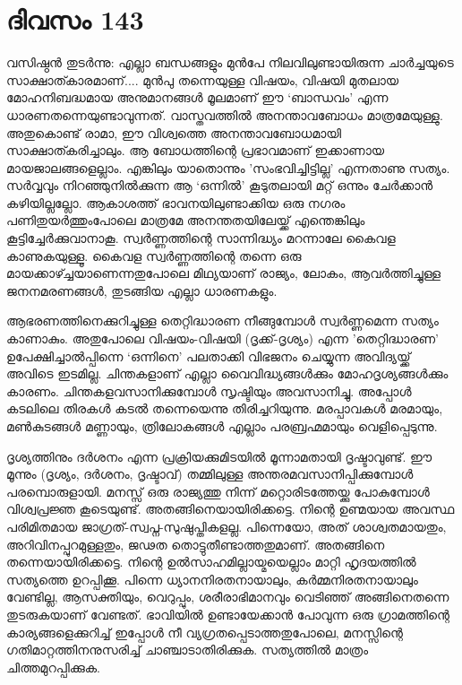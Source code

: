 \newpage
\section{ദിവസം 143}


വസിഷ്ഠൻ തുടർന്നു: എല്ലാ ബന്ധങ്ങളും മുൻപേ നിലവിലുണ്ടായിരുന്ന ചാര്‍ച്ചയുടെ  സാക്ഷാത്കാരമാണ്‌....   മുന്‍പു തന്നെയുള്ള  വിഷയം, വിഷയി മുതലായ  മോഹനിബദ്ധമായ അനുമാനങ്ങൾ മൂലമാണ്‌ ഈ ‘ബാന്ധവം’ എന്ന ധാരണതന്നെയുണ്ടാവുന്നത്. വാസ്തവത്തിൽ അനന്താവബോധം മാത്രമേയുള്ളു. അതുകൊണ്ട് രാമാ, ഈ വിശ്വത്തെ അനന്താവബോധമായി സാക്ഷാത്കരിച്ചാലും. ആ ബോധത്തിന്റെ പ്രഭാവമാണ്‌ ഇക്കാണായ മായജാലങ്ങളെല്ലാം. എങ്കിലും യാതൊന്നും 'സംഭവിച്ചിട്ടില്ല' എന്നതാണു സത്യം. സർവ്വവും നിറഞ്ഞുനിൽക്കുന്ന ആ ‘ഒന്നിൽ’ കൂടുതലായി മറ്റ് ഒന്നും ചേർക്കാൻ കഴിയില്ലല്ലോ. ആകാശത്ത് ഭാവനയിലുണ്ടാക്കിയ ഒരു നഗരം പണിതുയർത്തുംപോലെ മാത്രമേ അനന്തതയിലേയ്ക്ക് എന്തെങ്കിലും കൂട്ടിച്ചേർക്കുവാനാകൂ. സ്വർണ്ണത്തിന്റെ സാന്നിദ്ധ്യം മറന്നാലേ കൈവള കാണുകയുള്ളൂ. കൈവള സ്വർണ്ണത്തിന്റെ തന്നെ ഒരു മായക്കാഴ്ച്ചയാണെന്നതുപോലെ മിഥ്യയാണ്‌ രാജ്യം, ലോകം, ആവർത്തിച്ചുള്ള ജനനമരണങ്ങൾ, തുടങ്ങിയ എല്ലാ ധാരണകളും.

ആഭരണത്തിനെക്കുറിച്ചുള്ള തെറ്റിദ്ധാരണ നീങ്ങുമ്പോൾ സ്വർണ്ണമെന്ന സത്യം കാണാകും. അതുപോലെ വിഷയം-വിഷയി (ദൃക്ക്-ദൃശ്യം) എന്ന 'തെറ്റിദ്ധാരണ' ഉപേക്ഷിച്ചാൽപ്പിന്നെ ‘ഒന്നിനെ’ പലതാക്കി വിഭജനം ചെയ്യുന്ന അവിദ്യയ്ക്ക് അവിടെ ഇടമില്ല. ചിന്തകളാണ്‌ എല്ലാ വൈവിദ്ധ്യങ്ങള്‍ക്കും മോഹദൃശ്യങ്ങൾക്കും കാരണം. ചിന്തകളവസാനിക്കുമ്പോൾ സൃഷ്ടിയും അവസാനിച്ചു. അപ്പോൾ കടലിലെ തിരകൾ കടൽ തന്നെയെന്നു തിരിച്ചറിയുന്നു. മരപ്പാവകൾ മരമായും, മൺകുടങ്ങൾ മണ്ണായും, ത്രിലോകങ്ങൾ എല്ലാം പരബ്രഹ്മമായും വെളിപ്പെടുന്നു.

ദൃശ്യത്തിനും ദർശനം എന്ന പ്രക്രിയക്കുമിടയിൽ മൂന്നാമതായി ദൃഷ്ടാവുണ്ട്. ഈ മൂന്നും (ദൃശ്യം, ദർശനം, ദൃഷ്ടാവ്) തമ്മിലുള്ള അന്തരമവസാനിപ്പിക്കുമ്പോൾ പരമ്പൊരുളായി. മനസ്സ് ഒരു രാജ്യത്തു നിന്ന്‌ മറ്റൊരിടത്തേയ്ക്കു പോകുമ്പോൾ വിശ്വപ്രജ്ഞ കൂടെയുണ്ട്. അതങ്ങിനെയായിരിക്കട്ടെ. നിന്റെ ഉണ്മയായ അവസ്ഥ പരിമിതമായ ജാഗ്രത്-സ്വപ്ന-സുഷുപ്തികളല്ല. പിന്നെയോ, അത് ശാശ്വതമായതും, അറിവിനപ്പുറമുള്ളതും, ജഢത തൊട്ടുതീണ്ടാത്തതുമാണ്‌.   അതങ്ങിനെ തന്നെയായിരിക്കട്ടെ. നിന്റെ ഉൽസാഹമില്ലായ്മയെല്ലാം മാറ്റി ഹൃദയത്തിൽ സത്യത്തെ ഉറപ്പിക്കൂ. പിന്നെ ധ്യാനനിരതനായാലും, കർമ്മനിരതനായാലും വേണ്ടില്ല, ആസക്തിയും, വെറുപ്പും, ശരീരാഭിമാനവും വെടിഞ്ഞ് അങ്ങിനെതന്നെ തുടരുകയാണ് വേണ്ടത്. ഭാവിയിൽ ഉണ്ടായേക്കാന്‍ പോവുന്ന ഒരു ഗ്രാമത്തിന്റെ കാര്യങ്ങളെക്കുറിച്ച് ഇപ്പോൾ നീ വ്യഗ്രതപ്പെടാത്തതുപോലെ, മനസ്സിന്റെ ഗതിമാറ്റത്തിനനുസരിച്ച് ചാഞ്ചാടാതിരിക്കുക. സത്യത്തിൽ മാത്രം  ചിത്തമുറപ്പിക്കുക.

